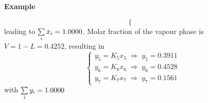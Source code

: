 \begin{MyExample}{\begin{center}{\bf Example}\end{center}}
\begin{displaymath}
\begin{cases}
        \end{cases}
   \end{displaymath}
   leading to $\summation[x_{i}]{i}{} = 1.0000$. Molar fraction of the vapour phase is $V= 1-L=0.4252$, resulting in
    \begin{displaymath}
        \begin{cases}
            y_{5} = K_{5}x_{5} \;\Longrightarrow\; y_{5} = 0.3911 \\
            y_{6} = K_{6}x_{6} \;\Longrightarrow\; y_{6} = 0.4528 \\
            y_{7} = K_{7}x_{7} \;\Longrightarrow\; y_{7} = 0.1561 
        \end{cases}
   \end{displaymath}
    with $\summation[y_{i}]{i}{} = 1.0000$
   \end{MyExample}
   

